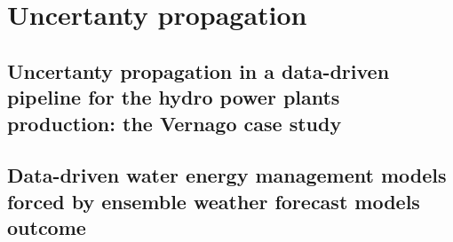\chapter{Uncertanty propagation}

\ifpdf
    \graphicspath{{Chapter6/Figs/Raster/}{Chapter6/Figs/PDF/}{Chapter5/Figs/}}
\else
    \graphicspath{{Chapter6/Figs/Vector/}{Chapter6/Figs/}}
\fi

\section{Uncertanty propagation in a data-driven pipeline for the hydro power plants production: the Vernago case study} %


\section{Data-driven water energy management models forced by ensemble weather forecast models outcome} %